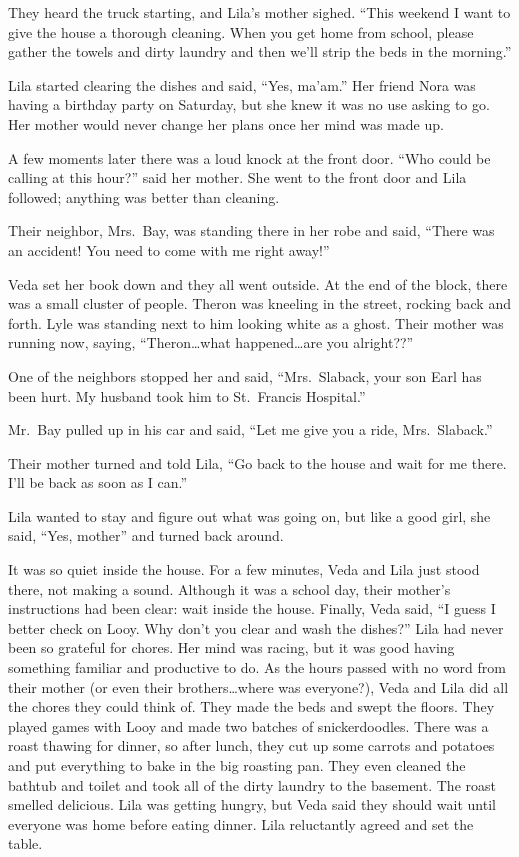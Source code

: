 \documentclass[
  letterpaper,
]{book}
\begin{document}
They heard the truck starting, and Lila's mother sighed. ``This weekend
I want to give the house a thorough cleaning. When you get home from
school, please gather the towels and dirty laundry and then we'll strip
the beds in the morning.''

Lila started clearing the dishes and said, ``Yes, ma'am.'' Her friend
Nora was having a birthday party on Saturday, but she knew it was no use
asking to go. Her mother would never change her plans once her mind was
made up.

A few moments later there was a loud knock at the front door. ``Who
could be calling at this hour?'' said her mother. She went to the front
door and Lila followed; anything was better than cleaning.

Their neighbor, Mrs.~Bay, was standing there in her robe and said,
``There was an accident! You need to come with me right away!''

Veda set her book down and they all went outside. At the end of the
block, there was a small cluster of people. Theron was kneeling in the
street, rocking back and forth. Lyle was standing next to him looking
white as a ghost. Their mother was running now, saying,
``Theron\ldots what happened\ldots are you alright??''

One of the neighbors stopped her and said, ``Mrs.~Slaback, your son Earl
has been hurt. My husband took him to St.~Francis Hospital.''

Mr.~Bay pulled up in his car and said, ``Let me give you a ride,
Mrs.~Slaback.''

Their mother turned and told Lila, ``Go back to the house and wait for
me there. I'll be back as soon as I can.''

Lila wanted to stay and figure out what was going on, but like a good
girl, she said, ``Yes, mother'' and turned back around.

It was so quiet inside the house. For a few minutes, Veda and Lila just
stood there, not making a sound. Although it was a school day, their
mother's instructions had been clear: wait inside the house. Finally,
Veda said, ``I guess I better check on Looy. Why don't you clear and
wash the dishes?'' Lila had never been so grateful for chores. Her mind
was racing, but it was good having something familiar and productive to
do. As the hours passed with no word from their mother (or even their
brothers\ldots where was everyone?), Veda and Lila did all the chores
they could think of. They made the beds and swept the floors. They
played games with Looy and made two batches of snickerdoodles. There was
a roast thawing for dinner, so after lunch, they cut up some carrots and
potatoes and put everything to bake in the big roasting pan. They even
cleaned the bathtub and toilet and took all of the dirty laundry to the
basement. The roast smelled delicious. Lila was getting hungry, but Veda
said they should wait until everyone was home before eating dinner. Lila
reluctantly agreed and set the table.
\end{document}
